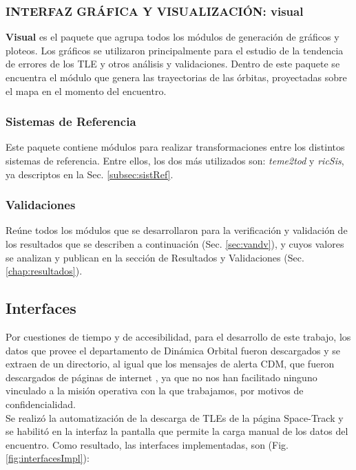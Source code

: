 \subsubsection*{INTERFAZ GR\'AFICA Y VISUALIZACI\'ON: visual}
{\bf{Visual}} es el paquete que agrupa todos los m\'odulos de generaci\'on de gr\'aficos y ploteos. Los gr\'aficos se utilizaron principalmente para el estudio de la tendencia de errores de los TLE y otros an\'alisis y validaciones.
Dentro de este paquete se encuentra el m\'odulo que genera las trayectorias de las \'orbitas, proyectadas sobre el mapa en el momento del encuentro.\\

\subsubsection*{Sistemas de Referencia}
Este paquete contiene m\'odulos para realizar transformaciones entre los distintos sistemas de referencia. Entre ellos, los dos m\'as utilizados son:
{\it{teme2tod}} y {\it{ricSis}}, ya descriptos en la Sec. \ref{subsec:sistRef}.

\subsubsection*{Validaciones}
Re\'une todos los m\'odulos que se desarrollaron para la verificaci\'on y validaci\'on de los resultados que se describen a continuaci\'on (Sec. \ref{sec:vandv}), y cuyos valores se analizan y publican en la secci\'on de Resultados y Validaciones (Sec. \ref{chap:resultados}).

\subsection{Interfaces}
Por cuestiones de tiempo y de accesibilidad, para el desarrollo de este trabajo, los datos que provee el departamento de Din\'amica Orbital fueron descargados y se extraen de un directorio, al igual que los mensajes de alerta CDM, que fueron descargados de p\'aginas de internet , ya que no nos han facilitado ninguno vinculado a la misi\'on operativa con la que trabajamos, por motivos de confidencialidad.\\

Se realiz\'o la automatizaci\'on de la descarga de TLEs de la p\'agina Space-Track y se habilit\'o en la interfaz la pantalla que permite la carga manual de los datos del encuentro. Como resultado, las interfaces implementadas, son (Fig. \ref{fig:interfacesImpl}):
 
